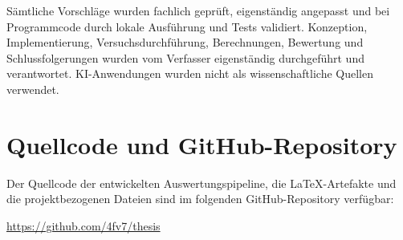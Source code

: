 \documentclass[12pt,a4paper,oneside,parskip=half]{scrreprt}
\begin{document}
Sämtliche Vorschläge wurden fachlich geprüft, eigenständig angepasst und
bei Programmcode durch lokale Ausführung und Tests validiert. Konzeption,
Implementierung, Versuchsdurchführung, Berechnungen, Bewertung und
Schlussfolgerungen wurden vom Verfasser eigenständig durchgeführt und
verantwortet. KI-Anwendungen wurden nicht als wissenschaftliche Quellen
verwendet.
\clearpage
\chapter*{Quellcode und GitHub-Repository}

Der Quellcode der entwickelten Auswertungspipeline, die LaTeX-Artefakte und die projektbezogenen Dateien sind im folgenden GitHub-Repository verfügbar:

\vspace{1cm}

\begin{center}
\large
\url{https://github.com/4fv7/thesis}
\end{center}
\end{document}
